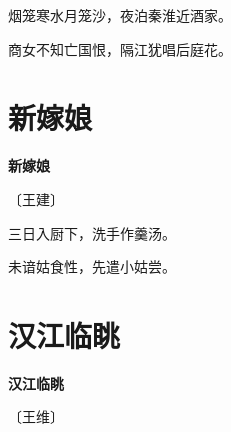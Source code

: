 \documentclass[12pt,UTF-8,openany,fontset=none]{ctexbook}
\begin{document}
\begin{center}
    \begin{Large}

        烟笼寒水月笼沙，夜泊秦淮近酒家。

        商女不知亡国恨，隔江犹唱后庭花。

    \end{Large}

\end{center}

\vspace{8pt}
\clearpage

\section{新嫁娘}


\begin{center}
    {\bfseries 新嫁娘}

    \vspace{18pt}

    \begin{large}\xuwen
        〔王建〕
    \end{large}

\end{center}

    \vspace{18pt}

\begin{center}
    \begin{Large}

        三日入厨下，洗手作羹汤。

        未谙姑食性，先遣小姑尝。

    \end{Large}

\end{center}

\vspace{8pt}
\clearpage

\section{汉江临眺}


\begin{center}
    {\bfseries 汉江临眺}

    \vspace{18pt}

    \begin{large}\xuwen
        〔王维〕
    \end{large}

\end{center}
\end{document}
